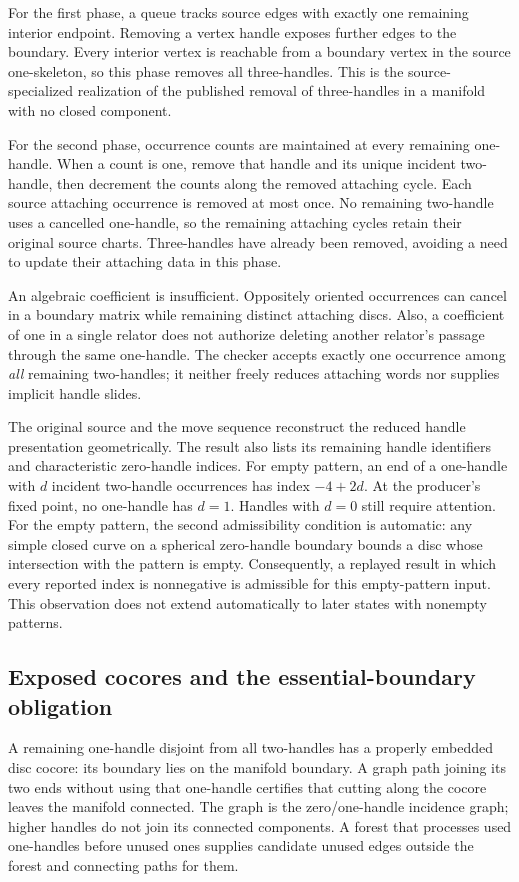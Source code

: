 For the first phase, a queue tracks source edges with exactly one remaining
interior endpoint. Removing a vertex handle exposes further edges to the
boundary. Every interior vertex is reachable from a boundary vertex in the
source one-skeleton, so this phase removes all three-handles. This is the
source-specialized realization of the published removal of three-handles
in a manifold with no closed component.

For the second phase, occurrence counts are maintained at every remaining
one-handle. When a count is one, remove that handle and its unique incident
two-handle, then decrement the counts along the removed attaching cycle.
Each source attaching occurrence is removed at most once. No remaining
two-handle uses a cancelled one-handle, so the remaining attaching cycles
retain their original source charts. Three-handles have already been
removed, avoiding a need to update their attaching data in this phase.

An algebraic coefficient is insufficient. Oppositely oriented occurrences
can cancel in a boundary matrix while remaining distinct attaching discs.
Also, a coefficient of one in a single relator does not authorize deleting
another relator's passage through the same one-handle. The checker accepts
exactly one occurrence among \emph{all} remaining two-handles; it neither
freely reduces attaching words nor supplies implicit handle slides.

The original source and the move sequence reconstruct the reduced handle
presentation geometrically. The result also lists its remaining handle
identifiers and characteristic zero-handle indices. For empty pattern, an
end of a one-handle with $d$ incident two-handle occurrences has index
$-4+2d$. At the producer's fixed point, no one-handle has $d=1$. Handles
with $d=0$ still require attention. For the empty pattern, the second
admissibility condition is automatic: any simple closed curve on a spherical
zero-handle boundary bounds a disc whose intersection with the pattern is
empty. Consequently, a replayed result in which every reported index is
nonnegative is admissible for this empty-pattern input. This observation does
not extend automatically to later states with nonempty patterns.

\subsection{Exposed cocores and the essential-boundary obligation}

A remaining one-handle disjoint from all two-handles has a properly embedded
disc cocore: its boundary lies on the manifold boundary. A graph path joining
its two ends without using that one-handle certifies that cutting along the
cocore leaves the manifold connected. The graph is the zero/one-handle
incidence graph; higher handles do not join its connected components.
A forest that processes used one-handles before unused ones supplies
candidate unused edges outside the forest and connecting paths for them.

